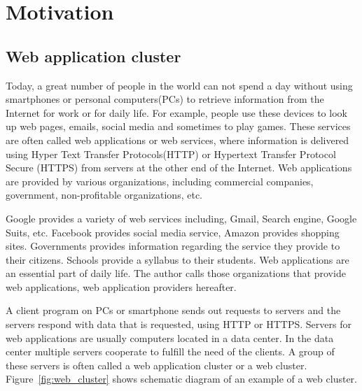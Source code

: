 
\section{Motivation}

\subsection{Web application cluster}

Today, a great number of people in the world can not spend a day without using smartphones or personal computers(PCs) to retrieve information from the Internet for work or for daily life.
For example, people use these devices to look up web pages, emails, social media and sometimes to play games.
These services are often called web applications or web services, where information is delivered using Hyper Text Transfer Protocols(HTTP) or Hypertext Transfer Protocol Secure (HTTPS) from servers at the other end of the Internet.
Web applications are provided by various organizations, including commercial companies, government, non-profitable organizations, etc.

Google provides a variety of web services including, Gmail, Search engine, Google Suits, etc.
Facebook provides social media service, Amazon provides shopping sites.
Governments provides information regarding the service they provide to their citizens.
Schools provide a syllabus to their students.
Web applications are an essential part of daily life.
The author calls those organizations that provide web applications, web application providers hereafter.

A client program on PCs or smartphone sends out requests to servers and the servers respond with data that is requested, using HTTP or HTTPS. 
Servers for web applications are usually computers located in a data center.
In the data center multiple servers cooperate to fulfill the need of the clients.
A group of these servers is often called a web application cluster or a web cluster.
Figure~\ref{fig:web_cluster} shows schematic diagram of an example of a web cluster.


